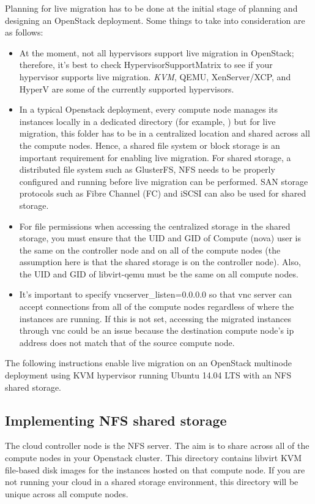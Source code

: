 \documentclass[letterpaper,10pt,english]{sphinxmanual}
\begin{document}
Planning for live migration has to be done at the initial stage of planning and designing an OpenStack deployment. Some things to take into consideration are as follows:
\begin{itemize}
\item {} 
At the moment, not all hypervisors support live migration in OpenStack; therefore, it’s best to check HypervisorSupportMatrix to see if your hypervisor supports live migration. \emph{KVM}, QEMU, XenServer/XCP, and HyperV are some of the currently supported hypervisors.

\item {} 
In a typical Openstack deployment, every compute node manages its instances locally in a dedicated directory (for example, ) but for live migration, this folder has to be in a centralized location and shared across all the compute nodes. Hence, a shared file system or block storage is an important requirement for enabling live migration. For shared storage, a distributed file system such as GlusterFS, NFS needs to be properly configured and running before live migration can be performed. SAN storage protocols such as Fibre Channel (FC) and iSCSI can also be used for shared storage.

\item {} 
For file permissions when accessing the centralized storage in the shared storage, you must ensure that the UID and GID of Compute (nova) user is the same on the controller node and on all of the compute nodes (the assumption here is that the shared storage is on the controller node). Also, the UID and GID of libvirt-qemu must be the same on all compute nodes.

\item {} 
It’s important to specify vncserver\_listen=0.0.0.0 so that vnc server can accept connections from all of the compute nodes regardless of where the instances are running. If this is not set, accessing the migrated instances through vnc could be an issue because the destination compute node’s ip address does not match that of the source compute node.

\end{itemize}

The following instructions enable live migration on an OpenStack multinode deployment using KVM hypervisor running Ubuntu 14.04 LTS with an NFS shared storage.


\subsection{Implementing NFS shared storage}
\label{_source/installation_guide/live_migration:implementing-nfs-shared-storage}
The cloud controller node is the NFS server. The aim is to share  across all of the compute nodes in your Openstack cluster. This directory contains libvirt KVM file-based disk images for the instances hosted on that compute node. If you are not running your cloud in a shared storage environment, this directory will be unique across all compute nodes.
\end{document}
